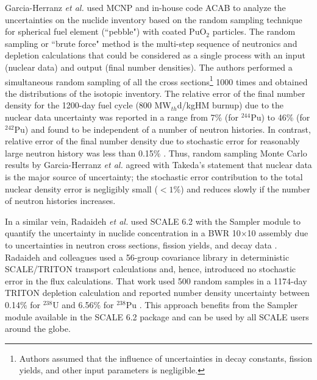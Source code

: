 Garcia-Herranz \emph{et al.} \cite{garcia-herranz_propagation_2008} used MCNP 
and in-house code ACAB to analyze the uncertainties on the nuclide inventory 
based on the random sampling technique for spherical fuel element (``pebble") 
with coated PuO$_2$ particles. The random sampling or ``brute force" method is 
the multi-step sequence of neutronics and depletion calculations that could be 
considered as a single process with an input (nuclear data) and output (final 
number densities). The authors performed a simultaneous random sampling of all 
the cross sections\footnote{Authors assumed that the influence of 
	uncertainties in decay constants, fission yields, and other input 
	parameters 
	is negligible.} 1000 times and obtained the distributions of the isotopic 
inventory. The relative error of the final number density for the 1200-day 
fuel cycle (800 MW$_{th}$d/kgHM burnup) due to the nuclear data uncertainty 
was reported in a range from 7\% (for $^{244}$Pu) to 46\% (for $^{242}$Pu) and 
found to be independent of a number of neutron histories. 
In contrast, relative error of the final number density due to stochastic 
error for reasonably large neutron history was less than 0.15\% 
\cite{garcia-herranz_propagation_2008}. Thus, random sampling Monte Carlo 
results by Garcia-Herranz \emph{et al.} agreed with Takeda's statement that 
nuclear data is the major source of uncertainty; the stochastic error 
contribution to the total nuclear density error is negligibly small ($<1$\%) 
and reduces slowly if the number of neutron histories increases.

In a similar vein, Radaideh \emph{et al.} used SCALE 6.2 with the Sampler 
module \cite{rearden_scale_2018} to quantify the uncertainty in nuclide 
concentration in a \gls{BWR} 10$\times$10 assembly due to uncertainties in 
neutron cross sections, fission yields, and decay data 
\cite{radaideh_using_2019}. Radaideh and colleagues used a 56-group covariance 
library in deterministic SCALE/TRITON transport calculations and, hence, 
introduced no stochastic error in the flux calculations. That work used 500 
random samples in a 1174-day TRITON depletion calculation and reported number 
density uncertainty between 0.14\% for $^{238}$U and 6.56\% for $^{238}$Pu 
\cite{radaideh_combining_2019}. This approach benefits from the Sampler module 
available in the SCALE 6.2 package and can be used by all SCALE users around 
the globe.


